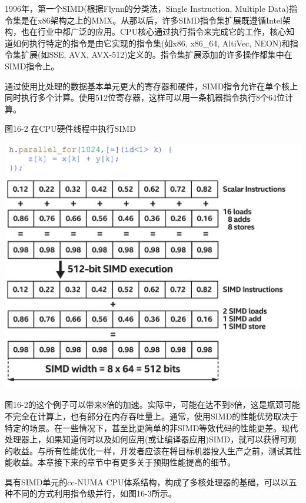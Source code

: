 1996年，第一个SIMD(根据Flynn的分类法，Single Instruction, Multiple Data)指令集是在x86架构之上的MMX。从那以后，许多SIMD指令集扩展既遵循Intel架构，也在行业中都广泛的应用。CPU核心通过执行指令来完成它的工作，核心知道如何执行特定的指令是由它实现的指令集(如x86, x86\_64, AltiVec, NEON)和指令集扩展(如SSE, AVX, AVX-512)定义的。指令集扩展添加的许多操作都集中在SIMD指令上。\par

通过使用比处理的数据基本单元更大的寄存器和硬件，SIMD指令允许在单个核上同时执行多个计算。使用512位寄存器，这样可以用一条机器指令执行8个64位计算。\par

\hspace*{\fill} \par %
图16-2 在CPU硬件线程中执行SIMD
\begin{center}
	\includegraphics[width=1.0\textwidth]{content/chapter-16/images/3}
\end{center}

图16-2的这个例子可以带来8倍的加速。实际中，可能在达不到8倍，这是瓶颈可能不完全在计算上，也有部分在内存吞吐量上。通常，使用SIMD的性能优势取决于特定的场景。在一些情况下，甚至比更简单的非SIMD等效代码的性能更差。现代处理器上，如果知道何时以及如何应用(或让编译器应用)SIMD，就可以获得可观的收益。与所有性能优化一样，开发者应该在将目标机器投入生产之前，测试其性能收益。本章接下来的章节中有更多关于预期性能提高的细节。\par

具有SIMD单元的cc-NUMA CPU体系结构，构成了多核处理器的基础，可以以五种不同的方式利用指令级并行，如图16-3所示。\par

